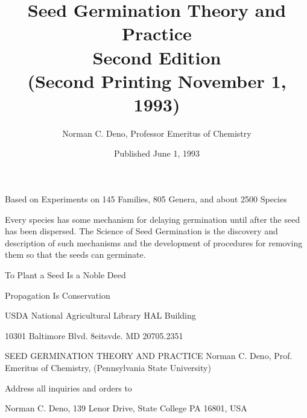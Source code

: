 \documentclass[oneside]{book}
\begin{document}

\title{Seed Germination Theory and Practice \\
Second Edition \\
(Second Printing November 1, 1993)
}

\author{Norman C. Deno, Professor Emeritus of Chemistry}

\date{Published June 1, 1993}

\frontmatter
\maketitle
\tableofcontents

\chapter*{}
Based on Experiments on 145 Families, 805 Genera, and about 2500 Species

Every species has some mechanism for delaying germination until
after the seed has been dispersed. The Science of Seed Germination is
the discovery and description of such mechanisms and the development
of procedures for removing them so that the seeds can germinate.

\begin{center}
To Plant a Seed Is a Noble Deed

Propagation Is Conservation

USDA National Agricultural Library
HAL Building

10301 Baltimore Blvd.
8eitsvde. MD 20705.2351

SEED GERMINATION THEORY AND PRACTICE
Norman C. Deno, Prof. Emeritus of Chemistry,
(Pennsylvania State University)
\end{center}

Address all inquiries and orders to

Norman C. Deno,
139 Lenor Drive, State College PA 16801, USA



\mainmatter


\end{document}
